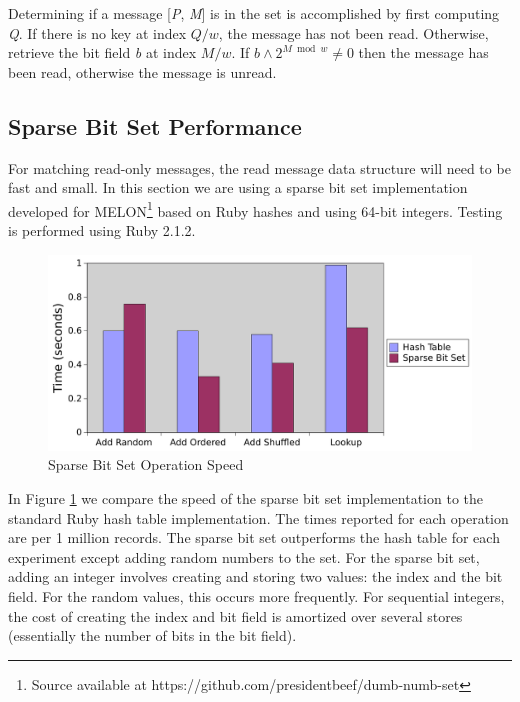 Determining if a message [\textit{P}, \textit{M}] is in the set is accomplished by first computing \textit{Q}. If there is no key at index $Q/w$, the message has not been read. Otherwise, retrieve the bit field \textit{b} at index $M / w$. If $b \wedge 2^{M \bmod w} \neq 0$ then the message has been read, otherwise the message is unread.

\subsection{Sparse Bit Set Performance}

For matching read-only messages, the read message data structure will need to be fast and small. In this section we are using a sparse bit set implementation developed for MELON\footnote{Source available at https://github.com/presidentbeef/dumb-numb-set} based on Ruby hashes and using 64-bit integers. Testing is performed using Ruby 2.1.2.

\begin{figure}
\centering
\includegraphics[width = \textwidth, scale = 0.75]{figures/bitset-speed.pdf}
\caption{Sparse Bit Set Operation Speed}
\label{fig:bitsetspeed}
\end{figure}

In Figure \ref{fig:bitsetspeed} we compare the speed of the sparse bit set implementation to the standard Ruby hash table implementation. The times reported for each operation are per 1 million records. The sparse bit set outperforms the hash table for each experiment except adding random numbers to the set. For the sparse bit set, adding an integer involves creating and storing two values: the index and the bit field. For the random values, this occurs more frequently. For sequential integers, the cost of creating the index and bit field is amortized over several stores (essentially the number of bits in the bit field).

